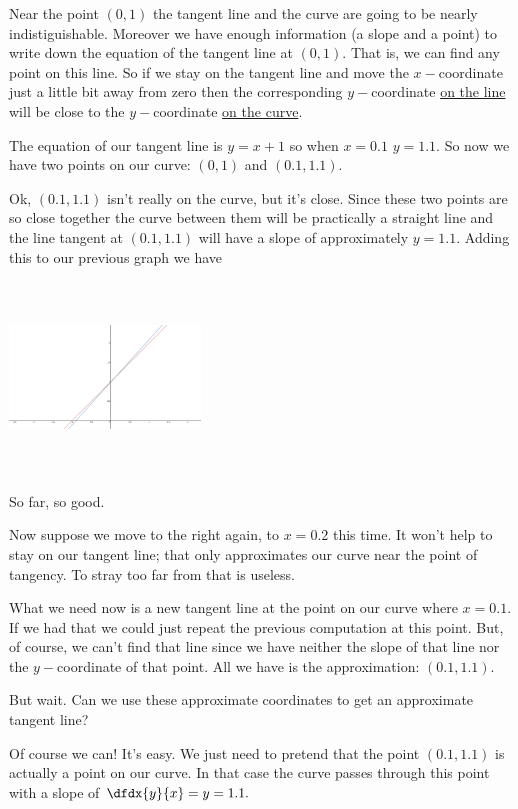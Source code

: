 Near the point $(0,1)$ the tangent line and the curve are going to be
nearly indistiguishable. Moreover we have enough information (a slope
and a point) to write down the equation of the tangent line at
$(0,1).$ That is, we can find any point on this line. So if we stay on
the tangent line and move the $x-$coordinate just a little bit away
from zero then the corresponding $y-$coordinate \underline{on the line} will be
close to the $y-$coordinate \underline{on the curve}.

The equation of our tangent line is $y=x+1$ so when $x=0.1$ $y=1.1.$
So now we have two points on our curve: $(0,1)$ and $(0.1, 1.1).$ 

Ok, $(0.1, 1.1)$ isn't really on the curve, but it's close. Since
these two points are so close together the curve between them will be
practically a straight line and the line tangent at $(0.1, 1.1)$ will
have a slope of approximately $y=1.1.$ Adding this to our previous
graph we have\\
\centerline{\includegraphics*[height=2in,width=2in]{Figures/exp-envelope2}}
So far, so good. 

Now suppose we move to the right again, to $x=0.2$ this time. It won't
help to stay on our tangent line; that only approximates our curve
near the point of tangency. To stray too far from that is useless.

What we need now is a new tangent line at the point on our curve where
$x=0.1.$ If we had that we could just repeat the previous computation
at this point. But, of course, we can't find that line since we have
neither the slope of that line nor the $y-$coordinate of that
point. All we have is the approximation: $(0.1, 1.1).$

But wait. Can we use these approximate coordinates to get an
approximate tangent line? 

Of course we can! It's easy. We just need to pretend that the point
$(0.1, 1.1)$ is actually a point on our curve. In that case the curve
passes through this point with a slope of $\dfdx{y}{x} = y = 1.1.$  
 
